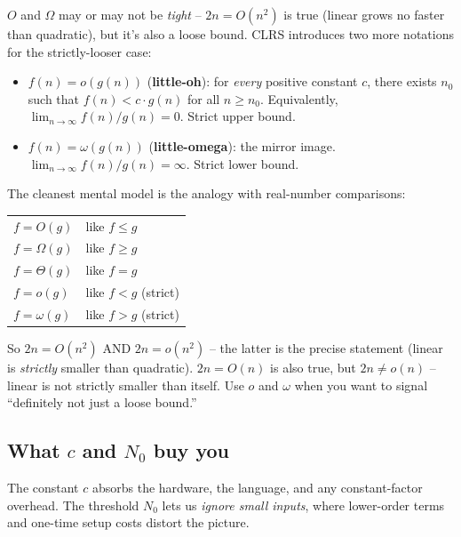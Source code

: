\documentclass[11pt]{article}
\begin{document}
\begin{notebox}
$O$ and $\Omega$ may or may not be \emph{tight} -- $2n = O(n^2)$ is
true (linear grows no faster than quadratic), but it's also a loose
bound. CLRS introduces two more notations for the strictly-looser
case:

\begin{itemize}[leftmargin=*,noitemsep]
  \item $f(n) = o(g(n))$ (\textbf{little-oh}): for \emph{every}
        positive constant $c$, there exists $n_0$ such that
        $f(n) < c \cdot g(n)$ for all $n \ge n_0$. Equivalently,
        $\lim_{n\to\infty} f(n)/g(n) = 0$. Strict upper bound.
  \item $f(n) = \omega(g(n))$ (\textbf{little-omega}): the mirror
        image. $\lim_{n\to\infty} f(n)/g(n) = \infty$. Strict lower bound.
\end{itemize}

The cleanest mental model is the analogy with real-number comparisons:

\begin{center}
\small
\begin{tabular}{@{}ll@{}}
$f = O(g)$       & like $f \le g$ \\
$f = \Omega(g)$  & like $f \ge g$ \\
$f = \Theta(g)$  & like $f = g$ \\
$f = o(g)$       & like $f < g$ \quad (strict) \\
$f = \omega(g)$  & like $f > g$ \quad (strict) \\
\end{tabular}
\normalsize
\end{center}

So $2n = O(n^2)$ AND $2n = o(n^2)$ -- the latter is the precise
statement (linear is \emph{strictly} smaller than quadratic).
$2n = O(n)$ is also true, but $2n \ne o(n)$ -- linear is not
strictly smaller than itself. Use $o$ and $\omega$ when you want to
signal ``definitely not just a loose bound.''
\end{notebox}

\subsection*{What $c$ and $N_0$ buy you}

The constant $c$ absorbs the hardware, the language, and any
constant-factor overhead. The threshold $N_0$ lets us \emph{ignore
small inputs}, where lower-order terms and one-time setup costs
distort the picture.
\end{document}
